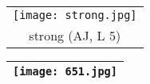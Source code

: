 \documentclass{tufte-book}
\begin{document}
\begin{fullwidth}
\begin{table}[h!]
\begin{tabular}{|c|}
 \hline
\end{tabular}
\label{page:65}
\end{table}

\begin{table}[h!]
\begin{tabular}{c}
\texttt{[image: strong.jpg]}\\
 strong (AJ, L 5)\\
\end{tabular}
\end{table}

\begin{table}[h!]
\begin{tabular}{|c|}
\hline
\texttt{[image: 651.jpg]}\\
 
 \hline
\end{tabular}
\label{page:index1nothumb}
\end{table}



\end{fullwidth}
\end{document}
